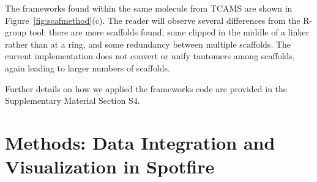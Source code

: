\documentclass[journal=jacsat,manuscript=article]{achemso}
\newcommand*\fref[1]{Figure~\ref{fig:#1}}
\begin{document}
The frameworks found within the same molecule from TCAMS are shown
in \fref{scafmethod}(c).  The reader will observe several differences
from the R-group tool: there are more scaffolds found, some clipped in
the middle of a linker rather than at a ring, and some redundancy
between multiple scaffolds. The current implementation does not
convert or unify tautomers among scaffolds, again leading to larger
numbers of scaffolds. %

Further details on how we applied 
the frameworks code are provided in the Supplementary Material Section S4. 

%
%


\section{Methods: Data Integration and Visualization in Spotfire}
\label{sec:methods2}
\end{document}
